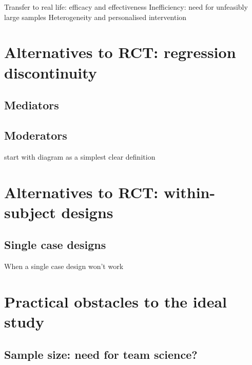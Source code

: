 \documentclass[]{book}
\begin{document}
Transfer to real life: efficacy and effectiveness
Inefficiency: need for unfeasibly large samples
Heterogeneity and personalised intervention

\hypertarget{alternatives-to-rct-regression-discontinuity}{%
\chapter{Alternatives to RCT: regression discontinuity}\label{alternatives-to-rct-regression-discontinuity}}

\hypertarget{mediators}{%
\section{Mediators}\label{mediators}}

\hypertarget{moderators}{%
\section{Moderators}\label{moderators}}

start with diagram as a simplest clear definition

\hypertarget{alternatives-to-rct-within-subject-designs}{%
\chapter{Alternatives to RCT: within-subject designs}\label{alternatives-to-rct-within-subject-designs}}

\hypertarget{single-case-designs}{%
\section{Single case designs}\label{single-case-designs}}

When a single case design won't work

\hypertarget{practical-obstacles-to-the-ideal-study}{%
\chapter{Practical obstacles to the ideal study}\label{practical-obstacles-to-the-ideal-study}}

\hypertarget{sample-size-need-for-team-science}{%
\section{Sample size: need for team science?}\label{sample-size-need-for-team-science}}
\end{document}
